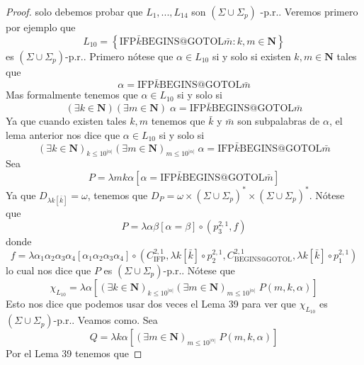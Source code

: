 \begin{lemma}
\begin{proof}
    solo debemos probar que \(L_{1},...,L_{14}\) son \((\Sigma \cup \Sigma _{p})\) -p.r.. Veremos primero por ejemplo que
    \[
      \displaystyle L_{10}=\left\{ \mathrm{IFP}\bar{k}\mathrm{BEGINS}@\mathrm{GOTOL}\bar{m} :k,m\in \mathbf{N}\right\}
    \]
    es \((\Sigma \cup \Sigma _{p})\)-p.r.. Primero nótese que \(\alpha \in L_{10}\) si y solo si existen
    \(k,m\in \mathbf{N}\) tales que
    \[
      \displaystyle \alpha =\mathrm{IFP}\bar{k}\mathrm{BEGINS}@\mathrm{GOTOL}\bar{m}
    \]
    Mas formalmente tenemos que \(\alpha \in L_{10}\) si y solo si
    \[
      \displaystyle (\exists k\in \mathbf{N})(\exists m\in \mathbf{N})\;\alpha =\mathrm{IFP}\bar{ k}\mathrm{BEGINS}@
      \mathrm{GOTOL}\bar{m}
    \]
    Ya que cuando existen tales \(k,m\) tenemos que \(\bar{k}\) y \(\bar{m}\) son subpalabras de \(\alpha \), el lema
    anterior nos dice que \(\alpha \in L_{10}\) si y solo si
    \[
      \displaystyle (\exists k\in \mathbf{N})_{k\leq 10^{\left\vert \alpha \right\vert }}(\exists m\in \mathbf{N})_{m
      \leq 10^{\left\vert \alpha \right\vert }}\;\alpha =\mathrm{IFP}\bar{k}\mathrm{BEGINS}@\mathrm{GOTOL}\bar{m}
    \]
    Sea
    \[
      \displaystyle P=\lambda mk\alpha \left[ \alpha =\mathrm{IFP}\bar{k}\mathrm{BEGINS}@\mathrm{ GOTOL}\bar{m}\right]
    \]
    Ya que \(D_{\lambda k\left[ \bar{k}\right] }=\omega \), tenemos que \( D_{P}=\omega \times (\Sigma \cup \Sigma _{p})
    ^{\ast }\times (\Sigma \cup \Sigma _{p})^{\ast }\). Nótese que
    \[
      \displaystyle P=\lambda \alpha \beta \left[ \alpha =\beta \right] \circ \left( p_{3}^{2,1},f\right)
    \]
    donde
    \[
      \displaystyle f=\lambda \alpha _{1}\alpha _{2}\alpha _{3}\alpha _{4}\left[ \alpha _{1}\alpha _{2}\alpha _{3}\alpha
      _{4}\right] \circ \left( C_{\mathrm{IFP} }^{2,1},\lambda k\left[ \bar{k}\right] \circ p_{2}^{2,1},C_{
      \mathrm{BEGINS}@ \mathrm{GOTOL}}^{2,1},\lambda k\left[ \bar{k}\right] \circ p_{1}^{2,1}\right)
    \]
    lo cual nos dice que \(P\) es \((\Sigma \cup \Sigma _{p})\)-p.r..
    Nótese que
    \[
      \displaystyle \chi _{L_{10}}=\lambda \alpha \left[ (\exists k\in \mathbf{N})_{k\leq 10^{\left\vert \alpha
      \right\vert }}(\exists m\in \mathbf{N})_{m\leq 10^{\left\vert \alpha \right\vert }}\;P(m,k,\alpha )\right]
    \]
    Esto nos dice que podemos usar dos veces el Lema 39 para ver que \(\chi _{L_{10}}\) es
    \((\Sigma \cup \Sigma _{p})\)-p.r.. Veamos como. Sea
    \[
      \displaystyle Q=\lambda k\alpha \left[ (\exists m\in \mathbf{N})_{m\leq 10^{\left\vert \alpha \right\vert }}\;
      P(m,k,\alpha )\right]
    \]
    Por el Lema 39 tenemos que

\end{proof}
\end{lemma}
